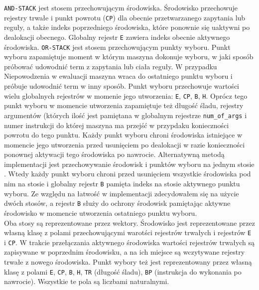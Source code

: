 \texttt{AND-STACK} jest stosem przechowującym środowiska. Środowisko przechowuje rejestry trwałe i punkt powrotu (\texttt{CP}) dla obecnie przetwarzanego zapytania lub reguły, a także indeks poprzedniego środowiska, które ponownie się uaktywni po dealokacji obecnego. Globalny rejestr \texttt{E} zawiera indeks obecnie aktywnego środowiska. \texttt{OR-STACK} jest stosem przechowującym punkty wyboru. Punkt wyboru zapamiętuje moment w którym maszyna dokonuje wyboru, w jaki sposób próbować udowodnić term z zapytania lub ciała reguły. W przypadku Niepowodzenia w ewaluacji maszyna wraca do ostatniego punktu wyboru i próbuje udowodnić term w inny sposób. Punkt wyboru przechowuje wartości wielu globalnych rejestrów w momenie jego utworzenia: \texttt{E}, \texttt{CP}, \texttt{B}, \texttt{H}. Oprócz tego punkt wyboru w momencie utworzenia zapamiętuje też długość śladu, rejestry argumentów (których ilość jest pamiętana w globalnym rejestrze \texttt{num\_of\_args} i numer instrukcji do której maszyna ma przejść w przypdaku konieczności powrotu do tego punktu. Każdy punkt wyboru chroni środowiska istniejące w momencie jego utworzenia przed usunięciem po dealokacji w razie konieczności ponownej aktywacji tego środowiska po nawrocie. Alternatywną metodą implementacji jest przechowywanie środowisk i punktów wyboru na jednym stosie \cite{WAM}. Wtedy każdy punkt wyboru chroni przed usunięciem wszystkie środowiska pod nim na stosie i globalny rejestr \texttt{B} pamięta indeks na stosie aktywnego punktu wyboru. Ze względu na łatwość w implementacji zdecydowałem się na użycie dwóch stosów, a rejestr \texttt{B} służy do ochrony środowisk pamiętając aktywne środowisko w momencie utworzenia ostatniego punktu wyboru.\\
Oba stosy są reprezentowane przez wektory. Środowisko jest reprezentowane przez własną klasę z polami przechowującymi warotści rejestrów trwałych i rejestrów \texttt{E} i \texttt{CP}. W trakcie przełączania aktywnego środowiska wartości rejestrów trwałych są zapisywane w poprzednim środowisku, a na ich miejsce są wczytywane rejestry trwałe z nowego środowiska. Punkt wybory też jest reprezentowany przez własną klasę z polami \texttt{E}, \texttt{CP}, \texttt{B}, \texttt{H}, \texttt{TR} (długość śladu), \texttt{BP} (instrukcja do wykonania po nawrocie). Wszystkie te pola są liczbami naturalnymi.